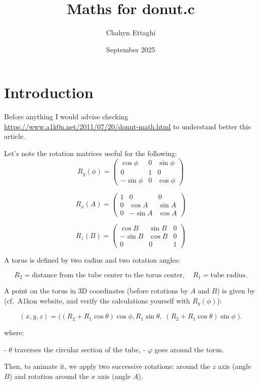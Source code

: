 \documentclass{article}
\title{Maths for donut.c}
\author{Chahyn Ettaghi}
\date{September 2025}
\begin{document}
\maketitle

\section{Introduction}
Before anything I would advise checking \underline{https://www.a1k0n.net/2011/07/20/donut-math.html} to understand better this article.

Let's note the rotation matrices useful for the following: 
\[
R_y(\phi) =
\begin{pmatrix}
\cos\phi & 0 & \sin\phi \\
0 & 1 & 0 \\
-\sin\phi & 0 & \cos\phi
\end{pmatrix}
\]

\[
R_x(A) =
\begin{pmatrix}
1 & 0 & 0 \\
0 & \cos A & \sin A \\
0 & -\sin A & \cos A
\end{pmatrix}
\]

\[
R_z(B) =
\begin{pmatrix}
\cos B & \sin B & 0 \\
-\sin B & \cos B & 0 \\
0 & 0 & 1
\end{pmatrix}
\]

A torus is defined by two radius and two rotation angles: 

\[
R_2 = \text{distance from the tube center to the torus center}, \quad
R_1 = \text{tube radius}.
\]

A point on the torus in 3D coordinates (before rotations by $A$ and $B$) is given by (cf.\ A1kon website, and verify the calculations yourself with $R_y(\phi)$):


\[
(x,y,z) =
\bigl((R_2 + R_1 \cos \theta)\cos \phi, R_1 \sin \theta,\; 
(R_2 + R_1 \cos \theta)\sin \phi \; 
 \bigr).
\]

where:  

- $\theta$ traverses the circular section of the tube,  
- $\varphi$ goes around the torus.  

\medskip

Then, to animate it, we apply two successive rotations: around the $z$ axis (angle $B$) and rotation around the $x$ axis (angle $A$).  
\end{document}
